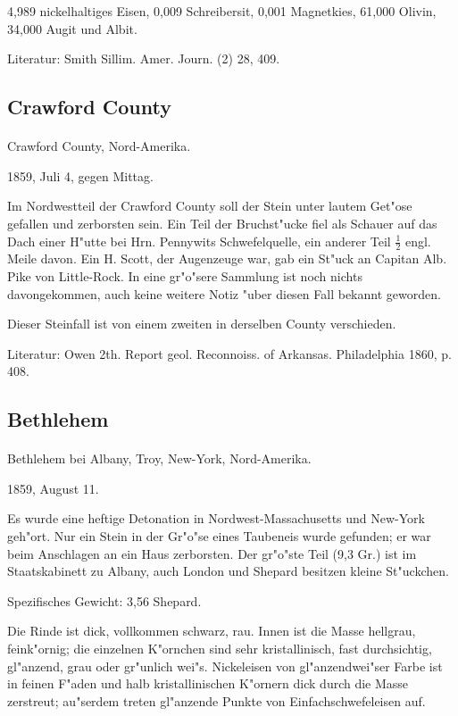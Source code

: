 \documentclass[a4paper, 11pt, oneside]{article}
\begin{document}
4,989 nickelhaltiges Eisen,  
0,009 Schreibersit,  
0,001 Magnetkies,  
61,000 Olivin,  
34,000 Augit und Albit.

Literatur: Smith Sillim. Amer. Journ. (2) 28, 409.

\subsection{Crawford County}
\normalsize
\paragraph{}
Crawford County, Nord-Amerika.

1859, Juli 4, gegen Mittag.

Im Nordwestteil der Crawford County soll der Stein unter lautem Get"ose gefallen und zerborsten sein. Ein Teil der Bruchst"ucke fiel als Schauer auf das Dach einer H"utte bei Hrn. Pennywits Schwefelquelle, ein anderer Teil $\frac{1}{2}$ engl. Meile davon. Ein H. Scott, der Augenzeuge war, gab ein St"uck an Capitan Alb. Pike von Little-Rock. In eine gr"o"sere Sammlung ist noch nichts davongekommen, auch keine weitere Notiz "uber diesen Fall bekannt geworden.

Dieser Steinfall ist von einem zweiten in derselben County verschieden.

Literatur: Owen 2th. Report geol. Reconnoiss. of Arkansas. Philadelphia 1860, p. 408.

\subsection{Bethlehem}
\normalsize
\paragraph{}
Bethlehem bei Albany, Troy, New-York, Nord-Amerika.

1859, August 11.

Es wurde eine heftige Detonation in Nordwest-Massachusetts und New-York geh"ort. Nur ein Stein in der Gr"o"se eines Taubeneis wurde gefunden; er war beim Anschlagen an ein Haus zerborsten. Der gr"o"ste Teil (9,3 Gr.) ist im Staatskabinett zu Albany, auch London und Shepard besitzen kleine St"uckchen.

Spezifisches Gewicht: 3,56 Shepard.

Die Rinde ist dick, vollkommen schwarz, rau. Innen ist die Masse hellgrau, feink"ornig; die einzelnen K"ornchen sind sehr kristallinisch, fast durchsichtig, gl"anzend, grau oder gr"unlich wei"s. Nickeleisen von gl"anzendwei"ser Farbe ist in feinen F"aden und halb kristallinischen K"ornern dick durch die Masse zerstreut; au"serdem treten gl"anzende Punkte von Einfachschwefeleisen auf.
\end{document}
